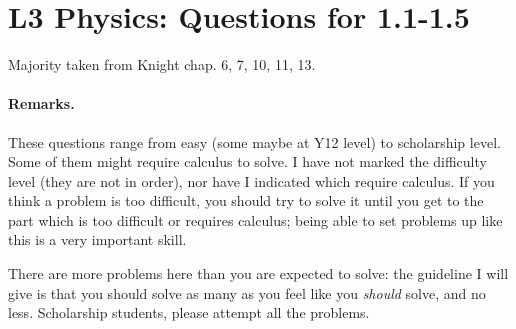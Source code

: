 \documentclass[a4paper]{exam}
\begin{document}
  \section*{L3 Physics: Questions for 1.1-1.5}
  Majority taken from Knight chap. 6, 7, 10, 11, 13.

  \paragraph{Remarks.} These questions range from easy (some maybe at Y12 level) to scholarship level. Some of them might require calculus to solve.
  I have not marked the difficulty level (they are not in order), nor have I indicated which require calculus. If you think a problem is too difficult,
  you should try to solve it until you get to the part which is too difficult or requires calculus; being able to set problems up like this is a very
  important skill.

  There are more problems here than you are expected to solve: the guideline I will give is that you should solve as many as you feel like you \emph{should}
  solve, and no less. Scholarship students, please attempt all the problems.
\end{document}
